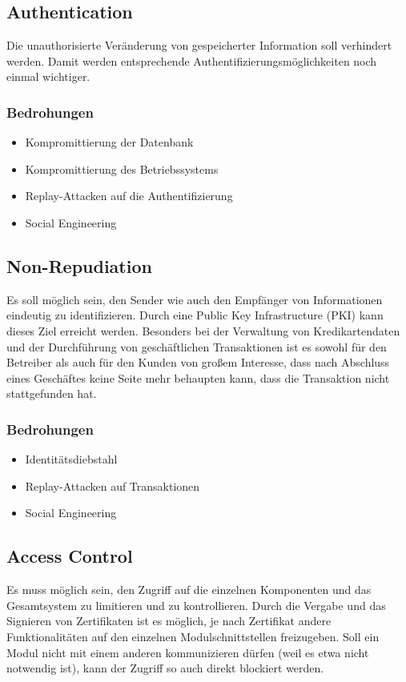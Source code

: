 \documentclass[12pt,a4paper,titlepage,oneside]{scrartcl}
\begin{document}
\subsection{Authentication}
Die unauthorisierte Veränderung von gespeicherter Information soll verhindert
werden. Damit werden entsprechende Authentifizierungsmöglichkeiten noch einmal
wichtiger.

\subsubsection{Bedrohungen}
\begin{itemize}
	\item Kompromittierung der Datenbank
	\item Kompromittierung des Betriebssystems
	\item Replay-Attacken auf die Authentifizierung
	\item Social Engineering
\end{itemize}

\subsection{Non-Repudiation}
Es soll möglich sein, den Sender wie auch den Empfänger von Informationen eindeutig
zu identifizieren. Durch eine Public Key Infrastructure (PKI) kann dieses Ziel
erreicht werden. Besonders bei der Verwaltung von Kredikartendaten und der
Durchführung von geschäftlichen Transaktionen ist es sowohl für den Betreiber
als auch für den Kunden von großem Interesse, dass nach Abschluss eines Geschäftes
keine Seite mehr behaupten kann, dass die Transaktion nicht stattgefunden hat.

\subsubsection{Bedrohungen}
\begin{itemize}
	\item Identitätsdiebstahl
	\item Replay-Attacken auf Transaktionen
	\item Social Engineering
\end{itemize}

\subsection{Access Control}
Es muss möglich sein, den Zugriff auf die einzelnen Komponenten und das Gesamtsystem
zu limitieren und zu kontrollieren. Durch die Vergabe und das Signieren von
Zertifikaten ist es möglich, je nach Zertifikat andere Funktionalitäten auf den
einzelnen Modulschnittstellen freizugeben. Soll ein Modul nicht mit einem anderen
kommunizieren dürfen (weil es etwa nicht notwendig ist), kann der Zugriff so
auch direkt blockiert werden.
\end{document}
